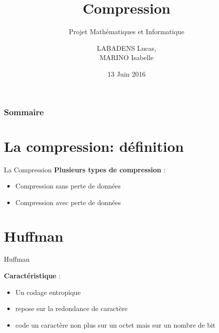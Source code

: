 \documentclass[french]{beamer}
\title{Compression}
\subtitle{Projet Mathématiques et Informatique}
\author[]{LABADENS Lucas, \\ MARINO Isabelle}
\date{13 Juin 2016}
\institute[L3 S6-- Informatique]{Université Paris 7 Diderot}
\begin{document}
\begin{frame}
	\titlepage
\end{frame}

\begin{frame}
	\frametitle{Sommaire}
	\tableofcontents	
\end{frame}

\section{La compression: définition }
\begin{frame}{La Compression}
	\textbf{Plusieurs types de compression} :
	\begin{itemize}
	\item<2-3>  Compression sans perte de données
	\item<3>  Compression avec perte de données
	\end{itemize}
\end{frame}

\section{Huffman}
\begin{frame}{Huffman}
	\begin{center}
	\textbf{Caractéristique} :\\
	
	\begin{itemize}
	\item  Un codage entropique
	\item  repose sur la redondance de caractère
	\item code un caractère non plus sur un octet mais sur un nombre de bit 
	\end{itemize}
	\end{center}
\end{frame}
\end{document}
